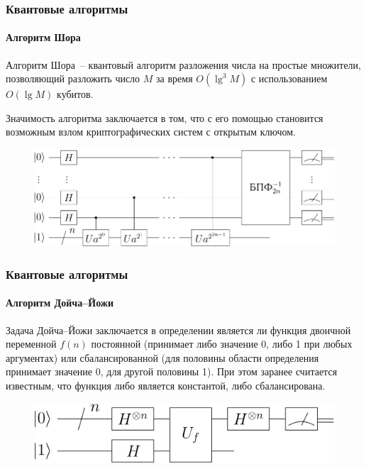 \documentclass[12pt,pdf]{beamer}
\renewcommand{\~}[1]{\widetilde{#1}}
\begin{document}
  \begin{frame}
    \frametitle{Квантовые алгоритмы}
    \framesubtitle{Алгоритм Шора}
    Алгоритм Шора~-- квантовый алгоритм разложения числа на простые множители,
    позволяющий разложить число \( M \) за время \( O(\lg^3M) \) с
    использованием \( O(\lg M) \) кубитов.
    
    Значимость алгоритма заключается в том, что с его помощью становится
    возможным взлом криптографических систем с открытым ключом.
    \begin{figure}[h!]
      \center
      \includegraphics[width=\textwidth]{shor}
    \end{figure}
  \end{frame}
  
  \begin{frame}
    \frametitle{Квантовые алгоритмы}
    \framesubtitle{Алгоритм Дойча--Йожи}
    Задача Дойча--Йожи заключается в определении является ли функция двоичной
    переменной \( f(n) \) постоянной (принимает либо значение 0, либо 1 при
    любых аргументах) или сбалансированной (для половины области определения
    принимает значение 0, для другой половины 1). При этом заранее считается
    известным, что функция либо является константой, либо сбалансирована.
    \begin{figure}[h!]
      \center
      \includegraphics[width=.75\textwidth]{deutch}
    \end{figure}
  \end{frame}
  
\end{document}
